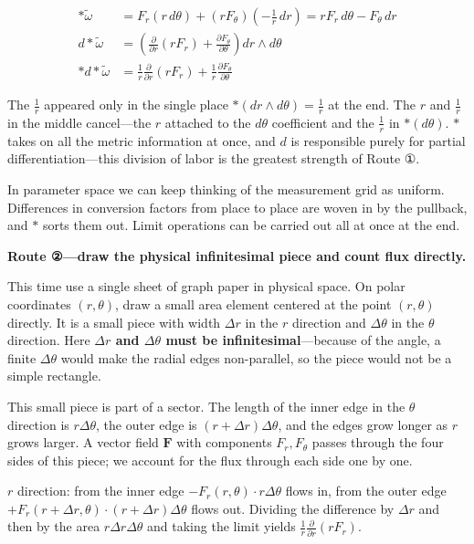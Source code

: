 \documentclass[a4paper,12pt,openany]{book}
\begin{document}
\[\begin{aligned}
\ast\tilde{\omega} &= F_r(r\,d\theta) + (r F_\theta)\!\left(-\frac{1}{r}\,dr\right) = r F_r\,d\theta - F_\theta\,dr \\[0.3em]
d\ast\tilde{\omega} &= \left(\frac{\partial}{\partial r}(r F_r) + \frac{\partial F_\theta}{\partial \theta}\right) dr \wedge d\theta \\[0.3em]
\ast d\ast\tilde{\omega} &= \frac{1}{r}\frac{\partial}{\partial r}(r F_r) + \frac{1}{r}\frac{\partial F_\theta}{\partial \theta}
\end{aligned}\]

The \(\frac{1}{r}\) appeared only in the single place
\(\ast(dr\wedge d\theta) = \frac{1}{r}\) at the end. The \(r\) and
\(\frac{1}{r}\) in the middle cancel—the \(r\) attached to the
\(d\theta\) coefficient and the \(\frac{1}{r}\) in \(\ast(d\theta)\).
\(\ast\) takes on all the metric information at once, and \(d\) is
responsible purely for partial differentiation—this division of labor
is the greatest strength of Route ①.

In parameter space we can keep thinking of the measurement grid as
uniform. Differences in conversion factors from place to place are woven
in by the pullback, and \(\ast\) sorts them out. Limit operations can be
carried out all at once at the end.

\textbf{Route ②—draw the physical infinitesimal piece and count flux directly.}

This time use a single sheet of graph paper in physical space. On polar
coordinates \((r,\theta)\), draw a small area element centered at the
point \((r,\theta)\) directly. It is a small piece with width
\(\Delta r\) in the \(r\) direction and \(\Delta\theta\) in the
\(\theta\) direction. Here
\textbf{$\Delta r$ and $\Delta\theta$ must be infinitesimal}—because
of the angle, a finite \(\Delta\theta\) would make the radial edges
non-parallel, so the piece would not be a simple rectangle.

This small piece is part of a sector. The length of the inner edge in
the \(\theta\) direction is \(r\Delta\theta\), the outer edge is
\((r+\Delta r)\Delta\theta\), and the edges grow longer as \(r\) grows
larger. A vector field \(\mathbf{F}\) with components \(F_r,F_\theta\)
passes through the four sides of this piece; we account for the flux
through each side one by one.

\(r\) direction: from the inner edge
\(-F_r(r,\theta) \cdot r\Delta\theta\) flows in, from the outer edge
\(+F_r(r+\Delta r,\theta) \cdot (r+\Delta r)\Delta\theta\) flows out.
Dividing the difference by \(\Delta r\) and then by the area
\(r\Delta r\Delta\theta\) and taking the limit yields
\(\frac{1}{r}\frac{\partial}{\partial r}(rF_r)\).
\end{document}
